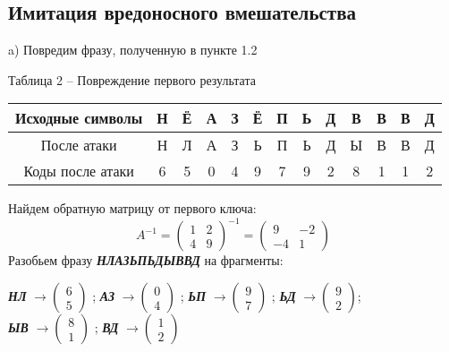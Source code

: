 \documentclass[a5paper, 10pt]{article}
\theoremstyle{definition}
\theoremstyle{plain}
\theoremstyle{remark}
\begin{document}
\subsection{Имитация вредоносного вмешательства}
 a) Повредим фразу, полученную в пункте 1.2
\begin{center}
Таблица 2 -- Повреждение первого результата\\
\begin{tabular}{ |c|c|c|c|c|c|c|c|c|c|c|c|c| } 
 \hline
Исходные символы & Н & Ё & А & З & Ё  & П & Ь  & Д & В  & В & В  & Д\\
\hline
После атаки  & Н & Л & А & З & Ь  & П & Ь  & Д & Ы  & В & В  & Д\\
 \hline
Коды после атаки & 6 & 5 & 0 & 4 & 9  & 7 & 9  & 2 & 8  & 1 & 1  & 2  \\
 \hline
\end{tabular}
\end{center}
Найдем обратную матрицу от первого ключа:
\begin{equation}
A^{-1} =
\begin{pmatrix}
1 & 2 \\
4 & 9
\end{pmatrix} ^{-1}
= 
\begin{pmatrix}
 9 & -2\\
 -4 &  1
\end{pmatrix}
\end{equation}
Разобьем фразу  \textbf{\textit{НЛАЗЬПЬДЫВВД}} на фрагменты:
\begin{center}
\textbf{\textit{НЛ}}
 $ \to \begin{pmatrix}
 6\\
5
\end{pmatrix} $  ;
 \textbf{\textit{АЗ}} $\to \begin{pmatrix}
 0\\
4
\end{pmatrix} $ ;
 \textbf{\textit{ЬП}} $\to \begin{pmatrix}
 9\\
7
\end{pmatrix} $ ;
 \textbf{\textit{ЬД}}  $ \to \begin{pmatrix}
9\\
2
\end{pmatrix}$; \\
\textbf{\textit{ЫВ}} $\to \begin{pmatrix}
 8\\
1
\end{pmatrix} $  ;
 \textbf{\textit{ВД}} $ \to \begin{pmatrix}
 1\\
2
\end{pmatrix}$ \\
\end{center}
\end{document}
